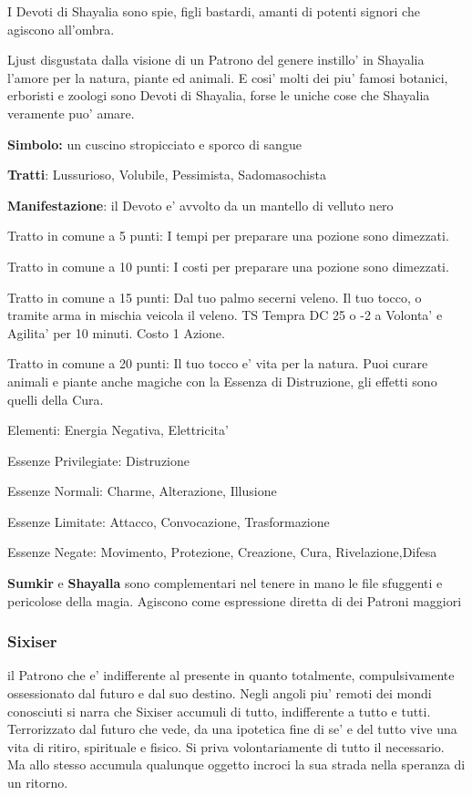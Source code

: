 \documentclass[a4paper,11pt,twoside,openany]{book}
\begin{document}
{I Devoti di Shayalia sono spie, figli bastardi, amanti di potenti signori che agiscono all'ombra.

Ljust disgustata dalla visione di un Patrono del genere instillo' in Shayalia l'amore per la natura, piante ed animali. E cosi' molti dei piu' famosi botanici, erboristi e zoologi sono Devoti di Shayalia, forse le uniche cose che Shayalia veramente puo' amare.

\textbf{Simbolo:} un cuscino stropicciato e sporco di sangue

\textbf{Tratti}: Lussurioso, Volubile, Pessimista, Sadomasochista

\textbf{Manifestazione}: il Devoto e' avvolto da un mantello di velluto nero

\bigskip

Tratto in comune a 5 punti: I tempi per preparare una pozione sono dimezzati.

Tratto in comune a 10 punti: I costi per preparare una pozione sono dimezzati.

Tratto in comune a 15 punti: Dal tuo palmo secerni veleno. Il tuo tocco, o tramite arma in mischia veicola il veleno. TS Tempra DC 25 o -2 a Volonta' e Agilita' per 10 minuti. Costo 1 Azione.

Tratto in comune a 20 punti: Il tuo tocco e' vita per la natura. Puoi curare animali e piante anche magiche con la Essenza di Distruzione, gli effetti sono quelli della Cura.

\bigskip

Elementi: Energia Negativa, Elettricita'

\bigskip

Essenze Privilegiate: Distruzione

Essenze Normali: Charme, Alterazione, Illusione

Essenze Limitate: Attacco, Convocazione, Trasformazione

Essenze Negate: Movimento, Protezione, Creazione, Cura, Rivelazione,Difesa

\textbf{Sumkir} e \textbf{Shayalla} sono complementari nel tenere in mano le file sfuggenti e pericolose della magia. Agiscono come espressione diretta di dei Patroni maggiori

\subsubsection{Sixiser}

il Patrono che e' indifferente al presente in quanto totalmente, compulsivamente ossessionato dal futuro e dal suo destino. Negli angoli piu' remoti dei mondi conosciuti si narra che Sixiser accumuli di tutto, indifferente a tutto e tutti. Terrorizzato dal futuro che vede, da una ipotetica fine di se' e del tutto vive una vita di ritiro, spirituale e fisico. Si priva volontariamente di tutto il necessario. Ma allo stesso accumula qualunque oggetto incroci la sua strada nella speranza di un ritorno.

}
\end{document}
